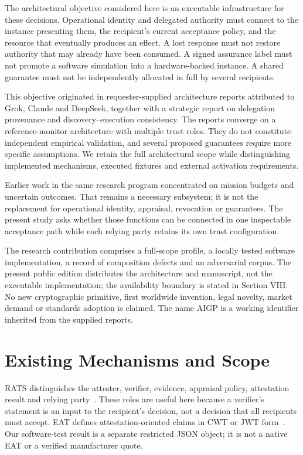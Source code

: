 \documentclass[journal,10pt]{IEEEtran}
\begin{document}
The architectural objective considered here is an executable infrastructure for these decisions. Operational identity and delegated authority must connect to the instance presenting them, the recipient's current acceptance policy, and the resource that eventually produces an effect. A lost response must not restore authority that may already have been consumed. A signed assurance label must not promote a software simulation into a hardware-backed instance. A shared guarantee must not be independently allocated in full by several recipients.

This objective originated in requester-supplied architecture reports attributed to Grok, Claude and DeepSeek, together with a strategic report on delegation provenance and discovery--execution consistency. The reports converge on a reference-monitor architecture with multiple trust roles. They do not constitute independent empirical validation, and several proposed guarantees require more specific assumptions. We retain the full architectural scope while distinguishing implemented mechanisms, executed fixtures and external activation requirements.

Earlier work in the same research program concentrated on mission budgets and uncertain outcomes. That remains a necessary subsystem; it is not the replacement for operational identity, appraisal, revocation or guarantees. The present study asks whether those functions can be connected in one inspectable acceptance path while each relying party retains its own trust configuration.

The research contribution comprises a full-scope profile, a locally tested software implementation, a record of composition defects and an adversarial corpus. The present public edition distributes the architecture and manuscript, not the executable implementation; the availability boundary is stated in Section VIII. No new cryptographic primitive, first worldwide invention, legal novelty, market demand or standards adoption is claimed. The name AIGP is a working identifier inherited from the supplied reports.

\section{Existing Mechanisms and Scope}
RATS distinguishes the attester, verifier, evidence, appraisal policy, attestation result and relying party~\cite{rats}. These roles are useful here because a verifier's statement is an input to the recipient's decision, not a decision that all recipients must accept. EAT defines attestation-oriented claims in CWT or JWT form~\cite{eat}. Our software-test result is a separate restricted JSON object; it is not a native EAT or a verified manufacturer quote.
\end{document}
